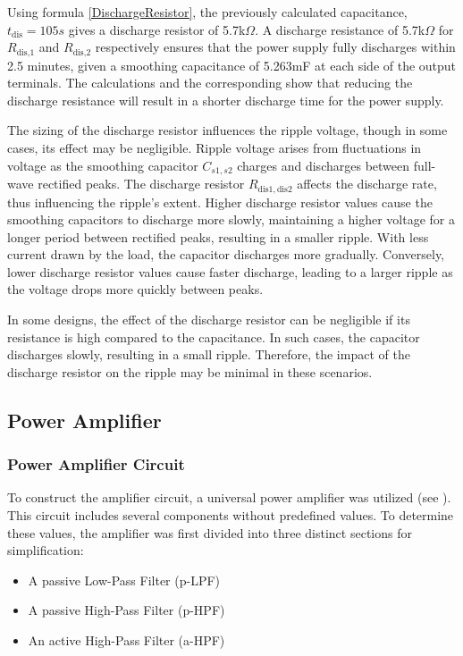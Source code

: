 Using formula \ref{DischargeResistor}, the previously calculated capacitance, $t_\text{dis}=105 s$ gives a discharge resistor of 5.7k$\Omega$. A discharge resistance of 5.7k$\Omega$ for $R_\text{dis,1}$ and $R_\text{dis,2}$ respectively ensures that the power supply fully discharges within 2.5 minutes, given a smoothing capacitance of 5.263mF at each side of the output terminals. The calculations and the corresponding  show that reducing the discharge resistance will result in a shorter discharge time for the power supply.

The sizing of the discharge resistor influences the ripple voltage, though in some cases, its effect may be negligible. Ripple voltage arises from fluctuations in voltage as the smoothing capacitor $C_{s1,s2}$ charges and discharges between full-wave rectified peaks. The discharge resistor $R_{\text{dis}1,\text{dis}2}$ affects the discharge rate, thus influencing the ripple's extent. Higher discharge resistor values cause the smoothing capacitors to discharge more slowly, maintaining a higher voltage for a longer period between rectified peaks, resulting in a smaller ripple. With less current drawn by the load, the capacitor discharges more gradually. Conversely, lower discharge resistor values cause faster discharge, leading to a larger ripple as the voltage drops more quickly between peaks.

In some designs, the effect of the discharge resistor can be negligible if its resistance is high compared to the capacitance. In such cases, the capacitor discharges slowly, resulting in a small ripple. Therefore, the impact of the discharge resistor on the ripple may be minimal in these scenarios.

\subsection{Power Amplifier}
\label{section: design PA}

\subsubsection{Power Amplifier Circuit}
To construct the amplifier circuit, a universal power amplifier was utilized (see ). This circuit includes several components without predefined values. To determine these values, the amplifier was first divided into three distinct sections for simplification:
\begin{itemize}
    \item A passive Low-Pass Filter (p-LPF)
    \item A passive High-Pass Filter (p-HPF)
    \item An active High-Pass Filter (a-HPF)
\end{itemize}

